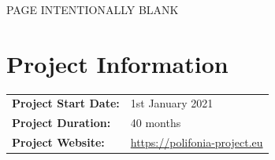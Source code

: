 \clearpage

\thispagestyle{empty}
\begin{center}

\vspace*{\fill}

{\Large{PAGE INTENTIONALLY BLANK}}

\vspace*{\fill}


\end{center}
\clearpage



\pagestyle{empty}


\section*{Project Information}

\begin{flushleft}
    \begin{tabular}{ll}
      \textbf{Project Start Date:}    &   1st January 2021\\
      \textbf{Project Duration:}    &   40 months\\
      \textbf{Project Website:}    &   \url{https://polifonia-project.eu}\\
    \end{tabular}

  \end{flushleft}


